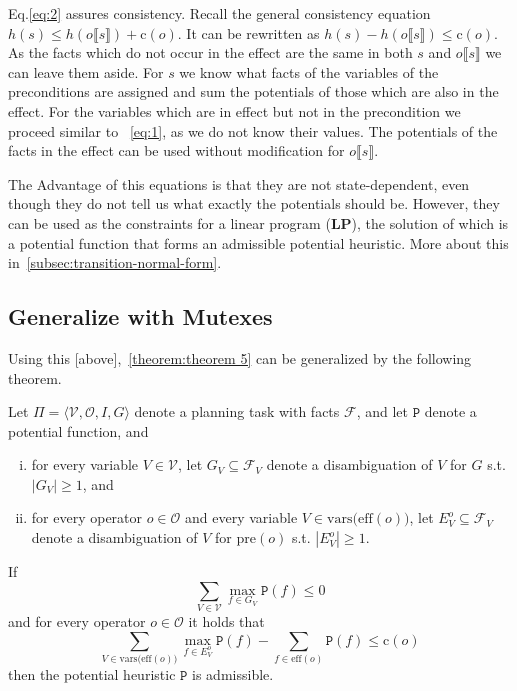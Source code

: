 Eq.\eqref{eq:2} assures consistency.
Recall the general consistency equation $h(s)\leq h(o\llbracket s\rrbracket)+\text{c}(o)$.
It can be rewritten as $h(s)-h(o\llbracket s\rrbracket)\leq\text{c}(o)$.
As the facts which do not occur in the effect are the same in both $s$ and $o\llbracket s\rrbracket$ we can leave them aside. %
For $s$ we know what facts of the variables of the preconditions are assigned and sum the potentials of those which are also in the effect.
For the variables which are in effect but not in the precondition we proceed similar to ~\eqref{eq:1}, as we do not know their values.
The potentials of the facts in the effect can be used without modification for  $o\llbracket s\rrbracket$.

The Advantage of this equations is that they are not state-dependent, even though they do not tell us what exactly the potentials should be.
However, they can be used as the constraints for a linear program (\textbf{LP}), the solution of which is a potential function that forms an admissible potential heuristic.
More about this in~\ref{subsec:transition-normal-form}.

\subsection{Generalize with Mutexes}\label{subsec:generalize-with-mutexes}

Using this [above],~\ref{theorem:theorem 5} can be generalized by the following theorem.

\begin{theorem}
    \label{theorem:7}
    Let $\Pi = \langle \mathcal{V}, \mathcal{O}, I, G \rangle$ denote a planning task with facts $\mathcal{F}$, and let $\mathtt{P}$ denote a potential function, and
    \begin{enumerate}[(i)]
        \item for every variable $V\in\mathcal{V}$, let $G_V\subseteq\mathcal{F}_V$ denote a disambiguation of $V$ for $G$ s.t. $|G_V|\geq1$, and
        \item for every operator $o\in\mathcal{O}$ and every variable $V\in\mathrm{vars(eff}(o))$, let $E^o_V\subseteq\mathcal{F}_V $ denote a disambiguation of $V$ for $\mathrm{pre}(o)$ s.t. $|E^o_V|\geq1$.
    \end{enumerate}

    If
    \[\sum_{V\in\mathcal{V}}\max_{f\in G_V}\mathtt{P}(f)\leq0\label{eq:3}\tag{3}\]
    and for every operator $o\in\mathcal{O}$ it holds that
    \[\sum_{V\in\mathrm{vars(eff}(o))}\max_{f\in E^o_V}\mathtt{P}(f) - \sum_{f\in\mathrm{eff}(o)}\mathtt{P}(f)\leq\mathrm{c}(o)\label{eq:4}\tag{4}\]
    then the potential heuristic $\mathtt{P}$ is admissible.
\end{theorem}

